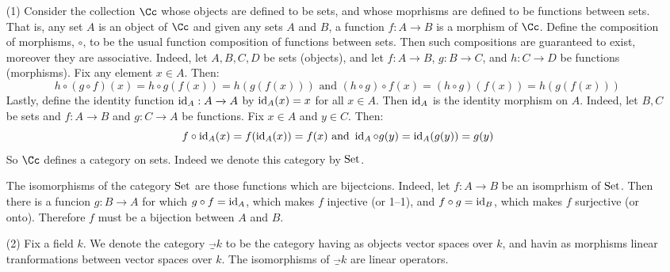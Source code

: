 \begin{example}\label{example_1.1}
  \begin{enumerate}
    \item[(1)] Consider the collection $\Cc$ whose objects are defined
      to be sets, and whose moprhisms are defined to be functions
      between sets. That is, any set $A$ is an object of $\Cc$ and
      given any sets $A$ and $B$, a function $f:A \xrightarrow{} B$ is
      a morphism of $\Cc$. Define the composition of morphisms,
      $\circ$, to be the usual function composition of functions
      between sets. Then such compositions are guaranteed to exist,
      moreover they are associative. Indeed, let $A,B,C,D$ be sets
      (objects), and let $f:A \xrightarrow{} B$, $g: B \xrightarrow{}
      C$, and $h:C \xrightarrow{} D$ be functions (morphisms). Fix any
      element $x \in A$. Then:
      \begin{equation*}
        h \circ (g \circ f)(x)=h \circ g(f(x))=h(g(f(x))) \text{ and }
        (h \circ g) \circ f(x)=(h \circ g)(f(x))=h(g(f(x)))
      \end{equation*}
      Lastly, define the identity function $\operatorname{id}_A:A \xrightarrow{} A$
      by $\operatorname{id}_A(x)=x$ for all $x \in A$. Then $\operatorname{id}_A$ is the identity
      morphism on $A$. Indeed, let $B,C$ be sets and $f:A
      \xrightarrow{} B$ and $g:C \xrightarrow{} A$ be functions. Fix
      $x \in A$ and $y \in C$. Then:
      \begin{equation*}
        f \circ \operatorname{id}_A(x)=f(\operatorname{id}_A(x))=f(x) \text{ and }
        \operatorname{id}_A \circ g(y)=\operatorname{id}_A(g(y))=g(y)
      \end{equation*}
      So $\Cc$ defines a category on sets. Indeed we denote this
      category by $\operatorname{Set}$.

      The isomorphisms of the category $\operatorname{Set}$ are those functions
      which are bijectcions. Indeed, let $f:A \xrightarrow{} B$ be an
      isomprhism of $\operatorname{Set}$. Then there is a funcion $g:B
      \xrightarrow{} A$ for which $g \circ f=\operatorname{id}_A$, which makes $f$
      injective (or 1--1), and $f \circ g=\operatorname{id}_B$, which makes $f$
      surjective (or onto). Therefore $f$ must be a bijection between
       $A$ and $B$.

     \item[(2)] Fix a field $k$. We denote the category $\Vec_k$ to be
       the category having as objects vector spaces over $k$, and
       havin as morphisms linear tranformations between vector spaces
       over $k$. The isomorphisms of $\Vec_k$ are linear operators.


\end{enumerate}
\end{example}

